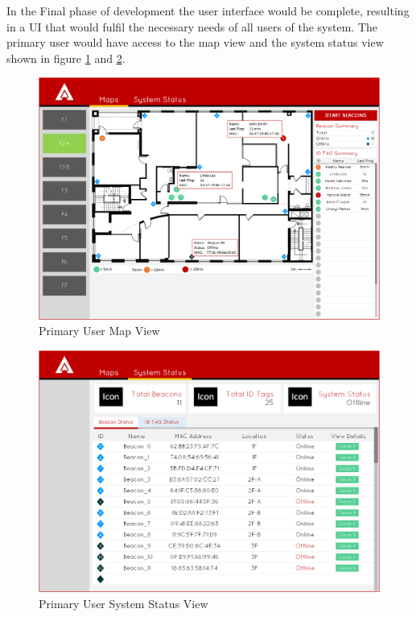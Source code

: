 \pagebreak

In the Final phase of development the user interface would be complete, resulting in a UI that would fulfil the necessary needs of all users of the system. The primary user would have access to the map view and the system status view shown in figure \ref{map_ff} and \ref{ss_ff}.

\medskip
\begin{figure}[H]
\centering
    \includegraphics[scale=0.45]{./images/UIMU_map_ff.png}
    \caption{Primary User Map View}
    \label{map_ff}
\end{figure}

\begin{figure}[H]
\centering
    \includegraphics[scale=0.45]{./images/UIMU_status_ff.png}
    \caption{Primary User System Status View}
    \label{ss_ff}
\end{figure}
\medskip

